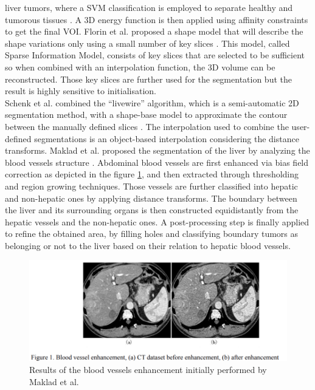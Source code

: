 \documentclass[]{article}
\begin{document}
	liver tumors, where a SVM classification is employed to separate healthy
	and tumorous tissues \cite{Freiman2011}. A 3D energy function is then applied using
	affinity constraints to get the final VOI.
	Florin et al. proposed a shape model that will describe the shape
	variations only using a small number of key slices \cite{Florin2007}. This model, called Sparse Information Model, consists of key slices that are selected to be
	sufficient so when combined with an interpolation function, the 3D
	volume can be reconstructed. Those key slices are further used for the
	segmentation but the result is highly sensitive to initialisation.\\
	Schenk et al. combined the ``livewire'' algorithm, which is a semi-automatic 2D segmentation method, with a
	shape-base model to approximate the contour between the manually defined
	slices \cite{Schenk2000}. The interpolation used to combine the user-defined segmentations
	is an object-based interpolation considering the distance transforms.
	Maklad et al. proposed the segmentation of the liver by analyzing the blood vessels
	structure \cite{Maklad2013}. Abdominal blood vessels are first enhanced via bias field correction as depicted in the figure \ref{Maklad2013_Fig1}, and then extracted through thresholding
	and region growing techniques. Those vessels are further classified into
	hepatic and non-hepatic ones by applying distance transforms. The
	boundary between the liver and its surrounding organs is then
	constructed equidistantly from the hepatic vessels and the non-hepatic
	ones. A post-processing step is finally applied to refine the obtained
	area, by filling holes and classifying boundary tumors as belonging or
	not to the liver based on their relation to hepatic blood vessels.
	
	\begin{figure}[th!]
		\centering
		\includegraphics[width=0.7\linewidth]{images/image4}
		\caption{Results of the blood vessels enhancement initially performed by Maklad et al. \cite{Maklad2013}}
		\label{Maklad2013_Fig1}
	\end{figure}
	
\end{document}

